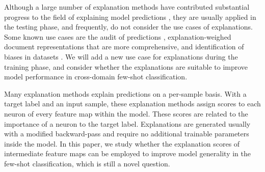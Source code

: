 \documentclass[a4paper,conference]{IEEEtran}
\begin{document}
Although a large number of explanation methods have contributed substantial progress to the field of explaining model predictions \cite{GRADIENT:simonyan2013deep,IntegratedGradient:sundararajan2017axiomatic,LRP:bach2015pixel,GRADCAM:selvaraju2017grad, LIME:ribeiro2016should, DEEPTAYLOR:Lmontavon2017explaining, DEEPLIFT:shrikumar2017learning, PATTERN:kindermans2017learning}, they are usually applied in the testing phase, and frequently, do not consider the use cases of explanations. Some known use cases are the audit of predictions \cite{ASSESS:Lapuschkin2019}, explanation-weighed document representations that are more comprehensive\cite{LRPreweight:arras2017relevant}, and identification of biases in datasets \cite{GRADCAM:selvaraju2017grad}. We will add a new use case for explanations during the training phase, and consider whether the explanations are suitable to improve model performance in cross-domain few-shot classification. 

Many explanation methods \cite{LRP:bach2015pixel,GRADIENT:simonyan2013deep, GRADCAM:selvaraju2017grad} explain predictions on a per-sample basis. With a target label and an input sample, these explanation methods assign scores to each neuron of every feature map within the model. These scores are related to the importance of a neuron to the target label. Explanations are generated usually with a modified backward-pass and require no additional trainable parameters inside the model. In this paper, we study whether the explanation scores of intermediate feature maps can be employed to improve model generality in the few-shot classification, which is still a novel question. 
\end{document}
